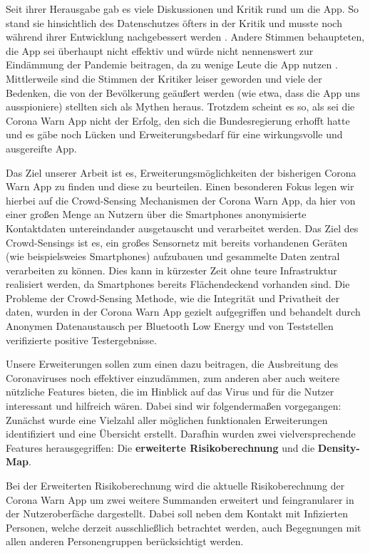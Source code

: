 \documentclass[conference,compsoc]{IEEEtran}
\begin{document}
Seit ihrer Herausgabe gab es viele Diskussionen und Kritik rund um die App. So stand sie hinsichtlich des Datenschutzes öfters in der Kritik und musste noch während ihrer Entwicklung nachgebessert werden \cite{CWAKritik}. 
Andere Stimmen behaupteten, die App sei überhaupt nicht effektiv und würde nicht nennenswert zur Eindämmung der Pandemie beitragen, da zu wenige Leute die App nutzen \cite{CWAKritik2}.
Mittlerweile sind die Stimmen der Kritiker leiser geworden und viele der Bedenken, die von der Bevölkerung geäußert werden (wie etwa, dass die App uns ausspioniere) stellten sich als Mythen heraus. 
Trotzdem scheint es so, als sei die Corona Warn App nicht der Erfolg, den sich die Bundesregierung erhofft hatte und es gäbe noch Lücken und Erweiterungsbedarf für eine wirkungsvolle und ausgereifte App.

Das Ziel unserer Arbeit ist es, Erweiterungsmöglichkeiten der bisherigen Corona Warn App zu finden und diese zu beurteilen. 
Einen besonderen Fokus legen wir hierbei auf die Crowd-Sensing Mechanismen der Corona Warn App, da hier von einer großen Menge an Nutzern über die Smartphones anonymisierte Kontaktdaten untereindander ausgetauscht und verarbeitet werden.
Das Ziel des Crowd-Sensings ist es, ein großes Sensornetz mit bereits vorhandenen Geräten (wie beispielsweies Smartphones) aufzubauen und gesammelte Daten zentral verarbeiten zu können. 
Dies kann in kürzester Zeit ohne teure Infrastruktur realisiert werden, da Smartphones bereits Flächendeckend vorhanden sind.
Die Probleme der Crowd-Sensing Methode, wie die Integrität und Privatheit der daten, wurden in der Corona Warn App gezielt aufgegriffen und behandelt durch Anonymen Datenaustausch per Bluetooth Low Energy und von Teststellen verifizierte positive Testergebnisse.

Unsere Erweiterungen sollen zum einen dazu beitragen, die Ausbreitung des Coronaviruses noch effektiver einzudämmen, zum anderen aber auch weitere nützliche Features bieten, die im Hinblick auf das Virus und für die Nutzer interessant und hilfreich wären.
Dabei sind wir folgendermaßen vorgegangen: Zunächst wurde eine Vielzahl aller möglichen funktionalen Erweiterungen identifiziert und eine Übersicht erstellt. 
Darafhin wurden zwei vielversprechende Features herausgegriffen: Die \textbf{erweiterte Risikoberechnung} und die \textbf{Density-Map}.

Bei der Erweiterten Risikoberechnung wird die aktuelle Risikoberechnung der Corona Warn App um zwei weitere Summanden erweitert und feingranularer in der Nutzeroberfäche dargestellt. 
Dabei soll neben dem Kontakt mit Infizierten Personen, welche derzeit ausschließlich betrachtet werden, auch Begegnungen mit allen anderen Personengruppen berücksichtigt werden.
\end{document}
